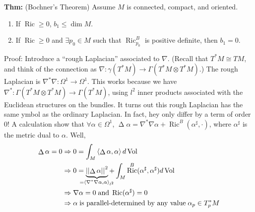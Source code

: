 \documentclass[10pt,letterpaper]{article}
\newcommand{\n}{\hfill\break}
\newcommand{\nn}{\vspace{0.5\baselineskip}\n}
\newcommand{\up}{\vspace{-\baselineskip}}
\newcommand{\hangblock}[2]{\par\noindent\settowidth{\hangindent}{\textbf{#1: }}\textbf{#1: }\nolinebreak#2}
\newcommand{\thm}[1]{\hangblock{Thm}{#1}}
\newcommand{\ptxt}[1]{\textrm{\textnormal{#1}}}
\DeclareMathOperator{\Ric}{Ric}
\DeclareMathOperator{\Vol}{Vol}
\DeclareMathOperator{\Laplacian}{\Delta}
\newcommand{\abs}[1]{\left|#1\right|}
\newcommand{\norm}[1]{\abs{\abs{#1}}}
\newcommand{\iprod}[1]{\left<#1\right>}
\begin{document}
\thm{
	(Bochner's Theorem) Assume $M$ is connected, compact, and oriented.
	\begin{enumerate}[label=(\alph*), leftmargin=4\parindent]
		\item If $\Ric\ge{}0$, $b_{1}\le\dim{}M$.
		\item If $\Ric\ge{}0$ and $\exists{}p_{0}\in{}M$ such that $\Ric_{p_{0}}^{B}$ is positive definite, then $b_{1}=0$.
	\end{enumerate}\up\nn
	Proof: Introduce a ``rough Laplacian'' associated to $\nabla$. (Recall that $T^{*}M\cong{}TM$, and think of the connection as $\nabla:\gamma(T^{*}M)\to\Gamma(T^{*}M\otimes{}T^{*}M)$.) The rough Laplacian is $\nabla^{*}\nabla:\Omega^{1}\to\Omega^{1}$. This works because we have $\nabla^{*}:\Gamma(T^{*}M\otimes{}T^{*}M)\to\Gamma(T^{*}M)$, using $l^{2}$ inner products associated with the Euclidean structures on the bundles.\nn
	It turns out this rough Laplacian has the same ymbol as the ordinary Laplacian. In fact, hey only differ by a term of order $0$! A calculation show that $\forall\alpha\in\Omega^{1}$, $\Laplacian\alpha=\nabla^{*}\nabla\alpha+\Ric^{B}(\alpha^{\sharp},\cdot)$, where $\alpha^{\sharp}$ is the metric dual to $\alpha$. Well,
	\begin{align*}
		\Laplacian\alpha=0 & \Rightarrow{}0=\int_{M}\iprod{\Laplacian\alpha,\alpha}d\Vol\\
		& \Rightarrow{}0=\underbrace{\norm{\Laplacian\alpha}^{2}}_{\mathclap{=\iprod{\nabla^{*}\nabla\alpha,\alpha}_{l^{2}}}}+\int_{M}\Ric^{B}(\alpha^{\sharp},\alpha^{\sharp})d\Vol\\
		& \Rightarrow\nabla\alpha=0\;\ptxt{and}\;\Ric(\alpha^{\sharp})=0\\
		& \Rightarrow\alpha\;\ptxt{is parallel-determined by any value}\;\alpha_{p}\in{}T_{p}^{*}M
	\end{align*}
}
\end{document}
